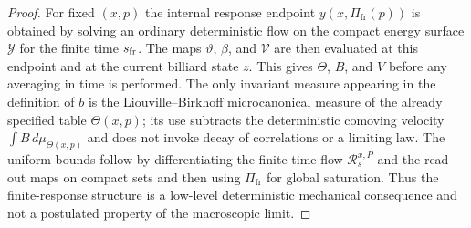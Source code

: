 \documentclass[12pt, letterpaper]{amsart}
\newcommand{\Pifr}{\Pi_{\mathrm{fr}}}
\theoremstyle{plain}
\theoremstyle{definition}
\theoremstyle{remark}
\begin{document}
\begin{proof}
For fixed $(x,p)$ the internal response endpoint $y(x,\Pifr(p))$ is obtained by
solving an ordinary deterministic flow on the compact energy surface
$\mathcal Y$ for the finite time $s_{\rm fr}$.  The maps $\vartheta$, $\beta$,
and $\mathcal V$ are then evaluated at this endpoint and at the current billiard
state $z$.  This gives $\Theta$, $B$, and $V$ before any averaging in time is
performed.  The only invariant measure appearing in the definition of $b$ is
the Liouville--Birkhoff microcanonical measure of the already specified table
$\Theta(x,p)$; its use subtracts the deterministic comoving velocity
$\int B\,d\mu_{\Theta(x,p)}$ and does not invoke decay of correlations or a
limiting law.  The uniform bounds follow by differentiating the finite-time
flow $\mathcal R_s^{x,P}$ and the read-out maps on compact sets and then using
$\Pifr$ for global saturation.  Thus the finite-response structure is a
low-level deterministic mechanical consequence and not a postulated property of
the macroscopic limit.
\end{proof}
\end{document}
